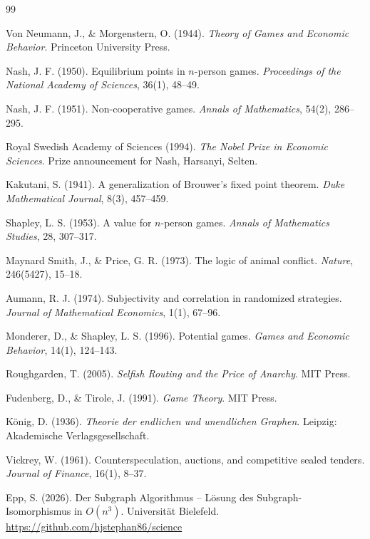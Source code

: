 ﻿\documentclass[a4paper,12pt]{article}
\theoremstyle{definition}
\begin{document}
\begin{thebibliography}{99}

Von Neumann, J., \& Morgenstern, O. (1944).
\textit{Theory of Games and Economic Behavior}.
Princeton University Press.

Nash, J. F. (1950).
Equilibrium points in $n$-person games.
\textit{Proceedings of the National Academy of Sciences}, 36(1), 48--49.

Nash, J. F. (1951).
Non-cooperative games.
\textit{Annals of Mathematics}, 54(2), 286--295.

Royal Swedish Academy of Sciences (1994).
\textit{The Nobel Prize in Economic Sciences}.
Prize announcement for Nash, Harsanyi, Selten.

Kakutani, S. (1941).
A generalization of Brouwer's fixed point theorem.
\textit{Duke Mathematical Journal}, 8(3), 457--459.

Shapley, L. S. (1953).
A value for $n$-person games.
\textit{Annals of Mathematics Studies}, 28, 307--317.

Maynard Smith, J., \& Price, G. R. (1973).
The logic of animal conflict.
\textit{Nature}, 246(5427), 15--18.

Aumann, R. J. (1974).
Subjectivity and correlation in randomized strategies.
\textit{Journal of Mathematical Economics}, 1(1), 67--96.

Monderer, D., \& Shapley, L. S. (1996).
Potential games.
\textit{Games and Economic Behavior}, 14(1), 124--143.

Roughgarden, T. (2005).
\textit{Selfish Routing and the Price of Anarchy}.
MIT Press.

Fudenberg, D., \& Tirole, J. (1991).
\textit{Game Theory}.
MIT Press.

K\"onig, D. (1936).
\textit{Theorie der endlichen und unendlichen Graphen}.
Leipzig: Akademische Verlagsgesellschaft.

Vickrey, W. (1961).
Counterspeculation, auctions, and competitive sealed tenders.
\textit{Journal of Finance}, 16(1), 8--37.

Epp, S. (2026).
Der Subgraph Algorithmus -- L\"osung des Subgraph-Isomorphismus in $O(n^3)$.
Universit\"at Bielefeld.
\url{https://github.com/hjstephan86/science}


\end{thebibliography}
\end{document}

